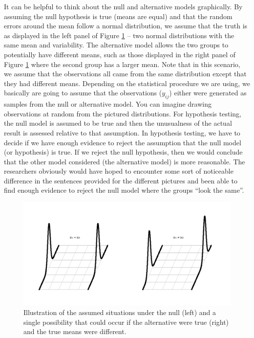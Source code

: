 \documentclass[]{book}
\theoremstyle{definition}
\theoremstyle{definition}
\theoremstyle{remark}
\begin{document}
It can be helpful to think about the null and alternative models
graphically. By assuming the null hypothesis is true (means are equal)
and that the random errors around the mean follow a normal distribution,
we assume that the truth is as displayed in the left panel of Figure
\ref{fig:Figure2-7} -- two normal distributions with the same mean and
variability. The alternative model allows the two groups to potentially
have different means, such as those displayed in the right panel of
Figure \ref{fig:Figure2-7} where the second group has a larger mean.
Note that in this scenario, we assume that the observations all came
from the same distribution except that they had different means.
Depending on the statistical procedure we are using, we basically are
going to assume that the observations (\(y_{ij}\)) either were generated
as samples from the null or alternative model. You can imagine drawing
observations at random from the pictured distributions. For hypothesis
testing, the null model is assumed to be true and then the unusualness
of the actual result is assessed relative to that assumption. In
hypothesis testing, we have to decide if we have enough evidence to
reject the assumption that the null model (or hypothesis) is true. If we
reject the null hypothesis, then we would conclude that the other model
considered (the alternative model) is more reasonable. The researchers
obviously would have hoped to encounter some sort of noticeable
difference in the sentences provided for the different pictures and been
able to find enough evidence to reject the null model where the groups
``look the same''.





\begin{figure}
\centering
\includegraphics{chapter1_files/image015.png}
\caption{\label{fig:Figure2-7}Illustration of the assumed situations under the null
(left) and a single possibility that could occur if the alternative were
true (right) and the true means were different.}
\end{figure}
\end{document}
